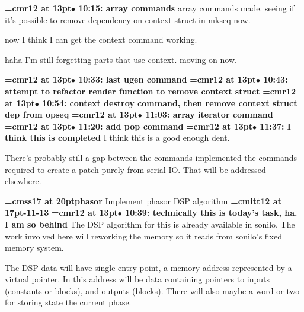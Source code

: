 {\smallskip\noindent\bf\font\titlefont=cmr12 at 13pt\titlefont $\bullet$ 10:15: array commands}\smallskip
array commands made. seeing if it's possible to remove dependency on context struct in mkseq now.
\par

now I think I can get the context command working.
\par

haha I'm still forgetting parts that use context. moving on now.
\par

{\smallskip\noindent\bf\font\titlefont=cmr12 at 13pt\titlefont $\bullet$ 10:33: last ugen command}\smallskip
{\smallskip\noindent\bf\font\titlefont=cmr12 at 13pt\titlefont $\bullet$ 10:43: attempt to refactor render function to remove context struct}\smallskip
{\smallskip\noindent\bf\font\titlefont=cmr12 at 13pt\titlefont $\bullet$ 10:54: context destroy command, then remove context struct dep from opseq}\smallskip
{\smallskip\noindent\bf\font\titlefont=cmr12 at 13pt\titlefont $\bullet$ 11:03: array iterator command}\smallskip
{\smallskip\noindent\bf\font\titlefont=cmr12 at 13pt\titlefont $\bullet$ 11:20: add pop command}\smallskip
{\smallskip\noindent\bf\font\titlefont=cmr12 at 13pt\titlefont $\bullet$ 11:37: I think this is completed}\smallskip
I think this is a good enough dent.
\par

There's probably still a gap between the commands implemented the commands required to create a patch purely from serial IO. That will be addressed elsewhere.
\par

{\medskip\noindent\bf\font\titlefont=cmss17 at 20pt\titlefont phasor}\medskip
Implement phasor DSP algorithm
{\medskip\noindent\bf\font\titlefont=cmitt12 at 17pt-11-13}\medskip
{\smallskip\noindent\bf\font\titlefont=cmr12 at 13pt\titlefont $\bullet$ 10:39: technically this is today's task, ha. I am so behind}\smallskip
The DSP algorithm for this is already available in sonilo. The work involved here will reworking the memory so it reads from sonilo's fixed memory system.
\par

The DSP data will have single entry point, a memory address represented by a virtual pointer. In this address will be data containing pointers to inputs (constants or blocks), and outputs (blocks). There will also maybe a word or two for storing state the current phase.
\par

